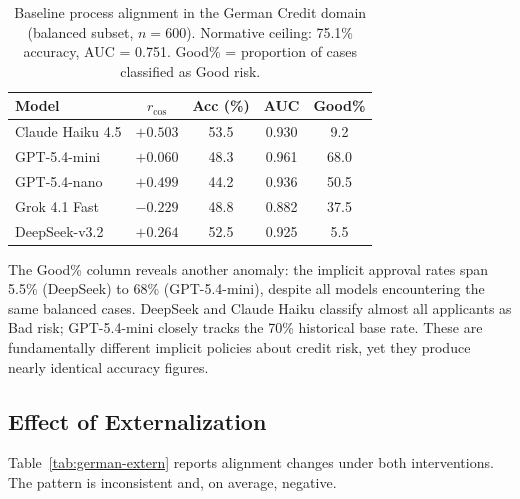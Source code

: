 \documentclass{article}
\begin{document}
\begin{table}[t]
  \caption{Baseline process alignment in the German Credit domain (balanced subset, $n=600$). Normative ceiling: 75.1\% accuracy, AUC = 0.751. Good\% = proportion of cases classified as Good risk.}
  \label{tab:german-baseline}
  \begin{center}
    \begin{small}
      \begin{tabular}{lcccc}
        \toprule
        Model & $r_{\cos}$ & Acc (\%) & AUC & Good\% \\
        \midrule
        Claude Haiku 4.5 & $+0.503$ & 53.5 & 0.930 &  9.2 \\
        GPT-5.4-mini     & $+0.060$ & 48.3 & 0.961 & 68.0 \\
        GPT-5.4-nano     & $+0.499$ & 44.2 & 0.936 & 50.5 \\
        Grok 4.1 Fast    & $-0.229$ & 48.8 & 0.882 & 37.5 \\
        DeepSeek-v3.2    & $+0.264$ & 52.5 & 0.925 &  5.5 \\
        \bottomrule
      \end{tabular}
    \end{small}
  \end{center}
\end{table}

The Good\% column reveals another anomaly: the implicit approval rates span 5.5\% (DeepSeek) to 68\% (GPT-5.4-mini), despite all models encountering the same balanced cases. DeepSeek and Claude Haiku classify almost all applicants as Bad risk; GPT-5.4-mini closely tracks the 70\% historical base rate. These are fundamentally different implicit policies about credit risk, yet they produce nearly identical accuracy figures.

\subsection{Effect of Externalization}

Table~\ref{tab:german-extern} reports alignment changes under both interventions. The pattern is inconsistent and, on average, negative.
\end{document}
